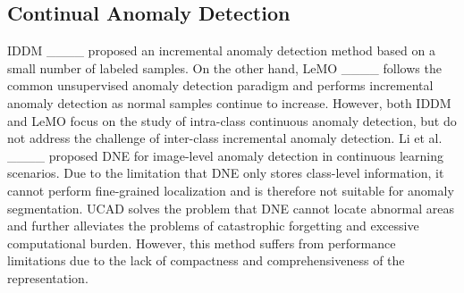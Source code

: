 
\subsection{Continual Anomaly Detection}
IDDM ____ proposed an incremental anomaly detection method based on a small number of labeled samples. On the other hand, LeMO ____ follows the common unsupervised anomaly detection paradigm and performs incremental anomaly detection as normal samples continue to increase. However, both IDDM and LeMO focus on the study of intra-class continuous anomaly detection, but do not address the challenge of inter-class incremental anomaly detection. Li et al. ____ proposed DNE for image-level anomaly detection in continuous learning scenarios. Due to the limitation that DNE only stores class-level information, it cannot perform fine-grained localization and is therefore not suitable for anomaly segmentation. UCAD solves the problem that DNE cannot locate abnormal areas and further alleviates the problems of catastrophic forgetting and excessive computational burden. However, this method suffers from performance limitations due to the lack of compactness and comprehensiveness of the representation.

